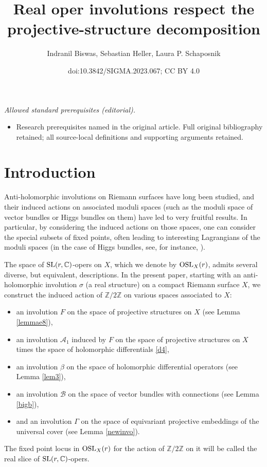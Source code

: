 \documentclass[10pt,a4paper]{amsart}
\title{Real oper involutions respect the projective-structure decomposition}
\author{Indranil Biswas, Sebastian Heller, Laura P. Schaposnik}
\date{doi:10.3842/SIGMA.2023.067; CC BY 4.0}
\numberwithin{equation}{section}
\begin{document}
\maketitle
\noindent\textit{Allowed standard prerequisites (editorial).}\begin{itemize}
\item Research prerequisites named in the original article. Full original bibliography retained; all source-local definitions and supporting arguments retained.
\end{itemize}\medskip
\section{Introduction}\label{intro.}

Anti-holomorphic involutions on Riemann surfaces have long been studied, and their induced
actions on associated moduli spaces (such as the moduli space of vector bundles or Higgs
bundles on them) have led to very fruitful results. In particular, by considering the
induced actions on those spaces, one can consider the special subsets of fixed points,
often leading to interesting Lagrangians of the moduli spaces (in the case of Higgs
bundles, see, for instance, \cite{real1,real2}).

The space of ${\rm SL}(r,\mathbb{C})$-opers on $X$, which we denote by ${\rm OSL}_X(r)$, admits several
diverse, but equivalent, descriptions. In the present paper, starting with an anti-holomorphic involution $\sigma$ (a real
structure) on a compact Riemann surface $X$, we construct the induced action of ${\mathbb Z}/2\mathbb Z$
on various spaces associated to $X$:
\begin{itemize}\itemsep=0pt
\item an involution $F$ on the space of projective structures on $X$ (see Lemma \ref{lemmae8}),
\item an involution $\mathcal A_1$ induced by $F$ on the space of projective structures on $X$ times the space of holomorphic differentials \eqref{d4},
\item an involution $\beta$ on
the space of holomorphic differential operators (see Lemma \ref{lem3}),
\item an involution $\mathcal B$ on the space of vector bundles with connections (see Lemma \ref{bigb}),
\item and an involution $\Gamma$ on the
space of equivariant projective embeddings of the universal cover (see Lemma \ref{newinvo}).
\end{itemize}
The fixed point locus in ${\rm OSL}_X(r)$ for the action of ${\mathbb Z}/2\mathbb Z$ on it will be called the
real slice of ${\rm SL}(r,{\mathbb C})$-opers.
\end{document}
